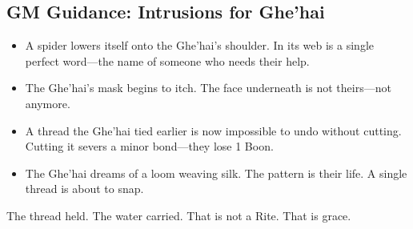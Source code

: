 \subsection{GM Guidance: Intrusions for Ghe'hai}

\begin{itemize}
\item A spider lowers itself onto the Ghe'hai's shoulder. In its web is a single perfect word—the name of someone who needs their help.
\item The Ghe'hai's mask begins to itch. The face underneath is not theirs—not anymore.
\item A thread the Ghe'hai tied earlier is now impossible to undo without cutting. Cutting it severs a minor bond—they lose 1 Boon.
\item The Ghe'hai dreams of a loom weaving silk. The pattern is their life. A single thread is about to snap.
\end{itemize}

The thread held. The water carried. That is not a Rite. That is grace.
